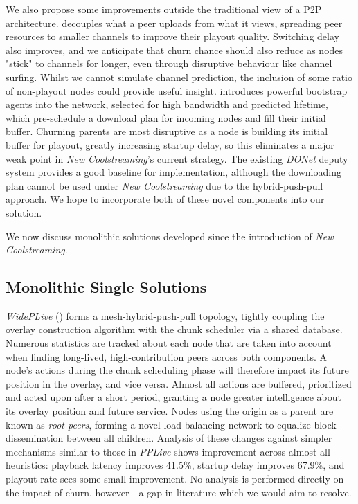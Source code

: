 \documentclass[12pt,a4paper]{article}
\begin{document}
We also propose some improvements outside the traditional view of a P2P architecture. \cite{Wu2009} decouples what a peer uploads from what it views, spreading peer resources to smaller channels to improve their playout quality. Switching delay also improves, and we anticipate that churn chance should also reduce as nodes "stick" to channels for longer, even through disruptive behaviour like channel surfing. Whilst we cannot simulate channel prediction, the inclusion of some ratio of non-playout nodes could provide useful insight. \cite{Huang2010} introduces powerful bootstrap agents into the network, selected for high bandwidth and predicted lifetime, which pre-schedule a download plan for incoming nodes and fill their initial buffer. Churning parents are most disruptive as a node is building its initial buffer for playout, greatly increasing startup delay, so this eliminates a major weak point in \textit{New Coolstreaming}'s current strategy. The existing \textit{DONet} deputy system provides a good baseline for implementation, although the downloading plan cannot be used under \textit{New Coolstreaming} due to the hybrid-push-pull approach. We hope to incorporate both of these novel components into our solution.

We now discuss monolithic solutions developed since the introduction of \textit{New Coolstreaming}. 

\subsection{Monolithic Single Solutions} \label{litreview:monoliths}
\textit{WidePLive} (\cite{Sina2020}) forms a mesh-hybrid-push-pull topology, tightly coupling the overlay construction algorithm with the chunk scheduler via a shared database. Numerous statistics are tracked about each node that are taken into account when finding long-lived, high-contribution peers across both components. A node's actions during the chunk scheduling phase will therefore impact its future position in the overlay, and vice versa. Almost all actions are buffered, prioritized and acted upon after a short period, granting a node greater intelligence about its overlay position and future service. Nodes using the origin as a parent are known as \textit{root peers}, forming a novel load-balancing network to equalize block dissemination between all children. Analysis of these changes against simpler mechanisms similar to those in \textit{PPLive} shows improvement across almost all heuristics: playback latency improves 41.5\%, startup delay improves 67.9\%, and playout rate sees some small improvement. No analysis is performed directly on the impact of churn, however - a gap in literature which we would aim to resolve.
\end{document}
